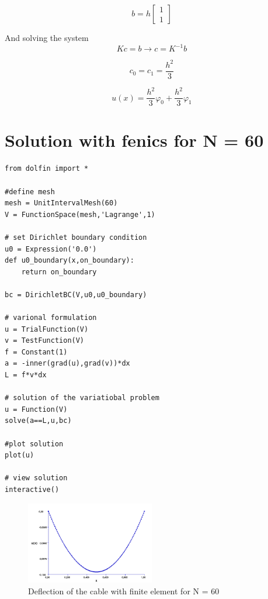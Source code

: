 \documentclass[10pt,a4paper]{report}
\begin{document}
\begin{equation}
b =h \begin{bmatrix}
       1            \\
       1             
     \end{bmatrix}
\end{equation}

And solving the system
\begin{equation}
Kc = b \rightarrow c = K^{-1}b \nonumber
\end{equation}

\begin{equation}
c_{0} = c_{1} = \frac{h^{2}}{3}\nonumber
\end{equation}

\begin{equation}
u(x) = \frac{h^{2}}{3}\varphi_{0}+\frac{h^{2}}{3}\varphi_{1} \nonumber
\end{equation}

\section{Solution with fenics for N = 60}

\begin{lstlisting}
from dolfin import *

#define mesh
mesh = UnitIntervalMesh(60)
V = FunctionSpace(mesh,'Lagrange',1)

# set Dirichlet boundary condition
u0 = Expression('0.0')
def u0_boundary(x,on_boundary):
    return on_boundary

bc = DirichletBC(V,u0,u0_boundary)

# varional formulation
u = TrialFunction(V)
v = TestFunction(V)
f = Constant(1)
a = -inner(grad(u),grad(v))*dx
L = f*v*dx

# solution of the variatiobal problem
u = Function(V)
solve(a==L,u,bc)

#plot solution
plot(u)

# view solution
interactive()
\end{lstlisting}

\begin{figure}[H]
  \caption{Deflection of the cable with finite element for N = 60}
  \centering
    \includegraphics[width=0.5\textwidth]{cable.png}
\end{figure}
\end{document}
